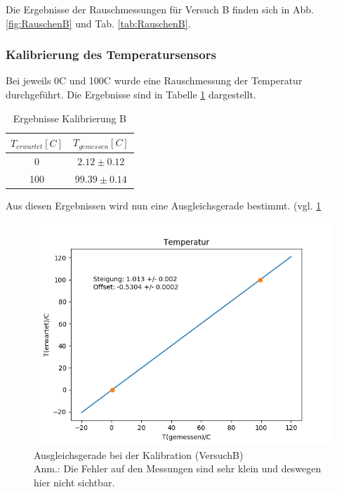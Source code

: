 \documentclass[12pt,a4paper]{article}
\begin{document}
Die Ergebnisse der Rauschmessungen für Versuch B finden sich in Abb. \ref{fig:RauschenB} und Tab. \ref{tab:RauschenB}.



\subsubsection{Kalibrierung des Temperatursensors}
Bei jeweils 0C und 100C wurde eine Rauschmessung der Temperatur durchgeführt. Die Ergebnisse sind in Tabelle \ref{tab:KaliB} dargestellt.

\begin{table}
\begin{center}
\begin{tabular}{|c|c|}
\hline 
$T_{erwartet}[C]$ & $T_{gemessen}[C]$ \\ 
\hline 
0 & $2.12\pm0.12$ \\ 
\hline 
100 & $99.39\pm0.14$ \\ 
\hline 
\end{tabular}
\caption[Ergebnisse Kalibrierung B]{Ergebnisse Kalibrierung B}
\label{tab:KaliB}
\end{center}
\end{table}

Aus diesen Ergebnissen wird nun eine Ausgleichsgerade bestimmt. (vgl. \ref{fig:GeradeKaliB}

\begin{figure}
\includegraphics[width=\linewidth]{Bilder/KalibrationB}
\begin{center}
\caption[KalibrationB]{Ausgleichsgerade bei der Kalibration (VersuchB)\\
Anm.: Die Fehler auf den Messungen sind sehr klein und deswegen hier nicht sichtbar.}
\label{fig:GeradeKaliB}
\end{center}
\end{figure}
\end{document}
